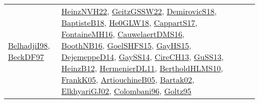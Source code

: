 {\begin{longtable}{lp{3cm}>{\raggedright}p{6cm}>{\raggedright}p{6cm}p{8cm}}
\href{articles/BelhadjiI98.pdf}{BelhadjiI98}\cite{BelhadjiI98}, \href{papers/BeckDF97.pdf}{BeckDF97}\cite{BeckDF97} & \href{articles/HeinzNVH22.pdf}{HeinzNVH22}\cite{HeinzNVH22}, \href{papers/GeitzGSSW22.pdf}{GeitzGSSW22}\cite{GeitzGSSW22}, \href{papers/DemirovicS18.pdf}{DemirovicS18}\cite{DemirovicS18}, \href{articles/BaptisteB18.pdf}{BaptisteB18}\cite{BaptisteB18}, \href{papers/He0GLW18.pdf}{He0GLW18}\cite{He0GLW18}, \href{papers/CappartS17.pdf}{CappartS17}\cite{CappartS17}, \href{papers/FontaineMH16.pdf}{FontaineMH16}\cite{FontaineMH16}, \href{papers/CauwelaertDMS16.pdf}{CauwelaertDMS16}\cite{CauwelaertDMS16}, \href{papers/BoothNB16.pdf}{BoothNB16}\cite{BoothNB16}, \href{articles/GoelSHFS15.pdf}{GoelSHFS15}\cite{GoelSHFS15}, \href{papers/GayHS15.pdf}{GayHS15}\cite{GayHS15}, \href{papers/DejemeppeD14.pdf}{DejemeppeD14}\cite{DejemeppeD14}, \href{papers/GaySS14.pdf}{GaySS14}\cite{GaySS14}, \href{papers/CireCH13.pdf}{CireCH13}\cite{CireCH13}, \href{papers/GuSS13.pdf}{GuSS13}\cite{GuSS13}, \href{papers/HeinzB12.pdf}{HeinzB12}\cite{HeinzB12}, \href{papers/HermenierDL11.pdf}{HermenierDL11}\cite{HermenierDL11}, \href{papers/BertholdHLMS10.pdf}{BertholdHLMS10}\cite{BertholdHLMS10}, \href{papers/FrankK05.pdf}{FrankK05}\cite{FrankK05}, \href{papers/ArtiouchineB05.pdf}{ArtiouchineB05}\cite{ArtiouchineB05}, \href{papers/Bartak02.pdf}{Bartak02}\cite{Bartak02}, \href{papers/ElkhyariGJ02.pdf}{ElkhyariGJ02}\cite{ElkhyariGJ02}, \href{papers/Colombani96.pdf}{Colombani96}\cite{Colombani96}, \href{papers/Goltz95.pdf}{Goltz95}\cite{Goltz95}\\

\end{longtable}}
